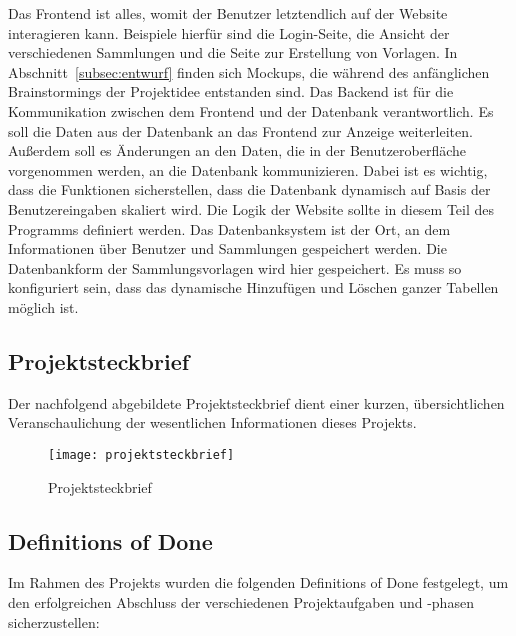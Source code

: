 Das Frontend ist alles, womit der Benutzer letztendlich auf der Website interagieren kann.
Beispiele hierfür sind die Login-Seite, die Ansicht der verschiedenen Sammlungen und die Seite zur Erstellung von Vorlagen.
In Abschnitt~\ref{subsec:entwurf} finden sich Mockups, die während des anfänglichen Brainstormings der Projektidee entstanden sind.
Das Backend ist für die Kommunikation zwischen dem Frontend und der Datenbank verantwortlich.
Es soll die Daten aus der Datenbank an das Frontend zur Anzeige weiterleiten.
Außerdem soll es Änderungen an den Daten, die in der Benutzeroberfläche vorgenommen werden, an die Datenbank kommunizieren.
Dabei ist es wichtig, dass die Funktionen sicherstellen, dass die Datenbank dynamisch auf Basis der Benutzereingaben skaliert wird.
Die Logik der Website sollte in diesem Teil des Programms definiert werden.
Das Datenbanksystem ist der Ort, an dem Informationen über Benutzer und Sammlungen gespeichert werden.
Die Datenbankform der Sammlungsvorlagen wird hier gespeichert.
Es muss so konfiguriert sein, dass das dynamische Hinzufügen und Löschen ganzer Tabellen möglich ist.

\subsection{Projektsteckbrief}\label{subsec:projektsteckbrief}
Der nachfolgend abgebildete Projektsteckbrief dient einer kurzen, übersichtlichen Veranschaulichung der wesentlichen Informationen dieses Projekts.

\begin{figure}[H]
    \centering
    \texttt{[image: projektsteckbrief]}
    \caption{Projektsteckbrief}\label{fig:projektsteckbrief}
\end{figure}

\newpage
\subsection{Definitions of Done}\label{subsec:definitions-of-done}



Im Rahmen des Projekts wurden die folgenden Definitions of Done festgelegt, um den erfolgreichen Abschluss der verschiedenen Projektaufgaben und -phasen sicherzustellen:

